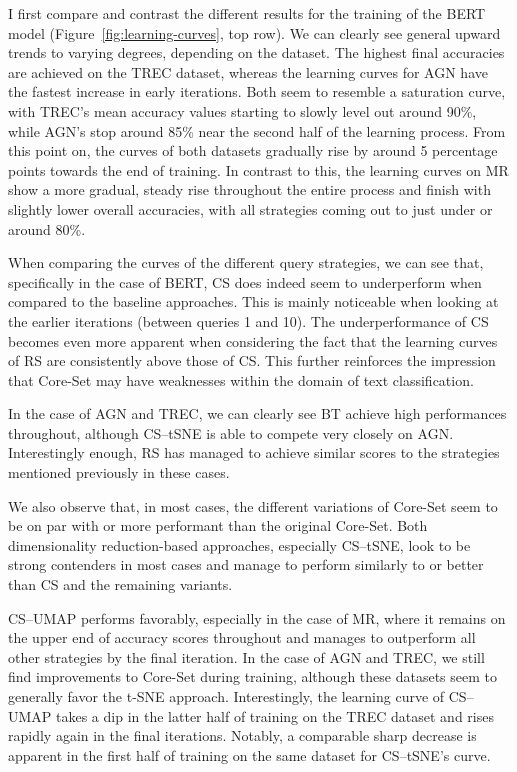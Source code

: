 \documentclass[english,bachelor,ul]{webisthesis} %
\begin{document}
I first compare and contrast the different results for the training of the BERT model (Figure~\ref{fig:learning-curves}, top row). We can clearly see general upward trends to varying degrees, depending on the dataset. The highest final accuracies are achieved on the TREC dataset, whereas the learning curves for AGN have the fastest increase in early iterations. Both seem to resemble a saturation curve, with TREC's mean accuracy values starting to slowly level out around 90\%, while AGN's stop around 85\% near the second half of the learning process. From this point on, the curves of both datasets gradually rise by around 5 percentage points towards the end of training. In contrast to this, the learning curves on MR show a more gradual, steady rise throughout the entire process and finish with slightly lower overall accuracies, with all strategies coming out to just under or around 80\%. 

When comparing the curves of the different query strategies, we can see that, specifically in the case of BERT, CS does indeed seem to underperform when compared to the baseline approaches. This is mainly noticeable when looking at the earlier iterations (between queries 1 and 10). The underperformance of CS becomes even more apparent when considering the fact that the learning curves of RS are consistently above those of CS. This further reinforces the impression that Core-Set may have weaknesses within the domain of text classification. 

In the case of AGN and TREC, we can clearly see BT achieve high performances throughout, although CS--tSNE is able to compete very closely on AGN. Interestingly enough, RS has managed to achieve similar scores to the strategies mentioned previously in these cases.

We also observe that, in most cases, the different variations of Core-Set seem to be on par with or more performant than the original Core-Set. Both dimensionality reduction-based approaches, especially CS--tSNE, look to be strong contenders in most cases and manage to perform similarly to or better than CS and the remaining variants. 

CS--UMAP performs favorably, especially in the case of MR, where it remains on the upper end of accuracy scores throughout and manages to outperform all other strategies by the final iteration. In the case of AGN and TREC, we still find improvements to Core-Set during training, although these datasets seem to generally favor the t-SNE approach. Interestingly, the learning curve of CS--UMAP takes a dip in the latter half of training on the TREC dataset and rises rapidly again in the final iterations. Notably, a comparable sharp decrease is apparent in the first half of training on the same dataset for CS--tSNE's curve.
\end{document}
